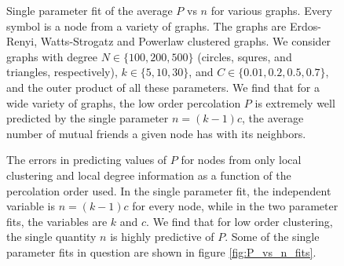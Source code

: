\documentclass{article}
\renewcommand{\=}[1]{\stackrel{#1}{=}} %
\begin{document}
\begin{figure}
\noindent{}
\noindent{}
\caption{
Single parameter fit of the average $P$ vs $n$ for various graphs. Every symbol is a node from a variety of graphs. The graphs are Erdos-Renyi, Watts-Strogatz and Powerlaw clustered graphs. We consider graphs with degree $N \in \{100,200,500\}$ (circles, squres, and triangles, respectively), $k \in \{5,10,30\}$, and $C \in \{0.01, 0.2, 0.5, 0.7\}$, and the outer product of all these parameters. We find that for a wide variety of graphs, the low order percolation $P$ is extremely well predicted by the single parameter $n = (k-1)c$, the average number of mutual friends a given node has with its neighbors.}

\label{fig:P_vs_n_means_fits}
\end{figure}

\begin{figure}
\noindent{}
\caption{
The errors in predicting values of $P$ for nodes from only local clustering and local degree information as a function of the percolation order used. In the single parameter fit, the independent variable is $n = (k-1)c$ for every node, while in the two parameter fits, the variables are $k$ and $c$. We find that for low order clustering, the single quantity $n$ is highly predictive of $P$. Some of the single parameter fits in question are shown in figure \ref{fig:P_vs_n_fits}.}

\label{fig:P_fitting_error}
\end{figure}


                

    
    
    
    
\end{document}

